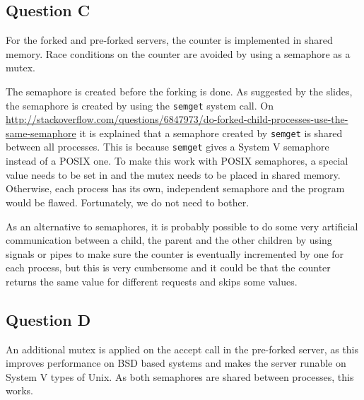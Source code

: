 \documentclass[11pt]{article}
\begin{document}
\subsection{Question C}

For the forked and pre-forked servers, the counter is implemented in shared memory. Race conditions on the counter are avoided by using a semaphore as a mutex.

The semaphore is created before the forking is done. As suggested by the slides, the semaphore is created by using the \texttt{semget} system call. On \url{http://stackoverflow.com/questions/6847973/do-forked-child-processes-use-the-same-semaphore} it is explained that a semaphore created by \texttt{semget} is shared between all processes. This is because \texttt{semget} gives a System V semaphore instead of a POSIX one. To make this work with POSIX semaphores, a special value needs to be set in and the mutex needs to be placed in shared memory. Otherwise, each process has its own, independent semaphore and the program would be flawed. Fortunately, we do not need to bother.

As an alternative to semaphores, it is probably possible to do some very artificial communication between a child, the parent and the other children by using signals or pipes to make sure the counter is eventually incremented by one for each process, but this is very cumbersome and it could be that the counter returns the same value for different requests and skips some values.

\subsection{Question D}

An additional mutex is applied on the accept call in the pre-forked server, as this improves performance on BSD based systems and makes the server runable on System V types of Unix. As both semaphores are shared between processes, this works.
\end{document}
